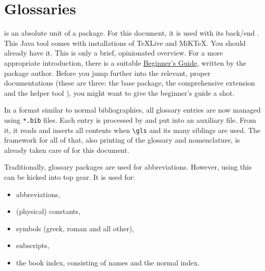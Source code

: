 \section{Glossaries}
\label{ch:glossaries}

 is an absolute unit of a package.
For this document, it is used with its back\-/end .
This Java tool comes with installations of TeXLive and MiKTeX.
You should already have it.
This  is only a brief, opinionated overview.
For a more appropriate introduction, there is a suitable
\href{http://tug.ctan.org/macros/latex/contrib/glossaries/glossariesbegin.pdf}{Beginner's Guide},
written by the package author.
Before you jump further into the relevant, proper documentations (these are three: the
 base package, the comprehensive extension
 and the helper tool ), you might
want to give the beginner's guide a shot.

In a format similar to normal bibliographies, all glossary entries are now managed
using \texttt{*.bib} files.
Each entry is processed by  and put into an auxiliary file.
From it, it reads and inserts all contents when \verb|\gls| and its many siblings
are used.
The framework for all of that, also printing of the glossary and nomenclature,
is already taken care of for this document.

Traditionally, glossary packages are used for abbreviations.
However, using  this can be kicked into top gear.
It is used for:
\begin{itemize}
    \item abbreviations,
    \item (physical) constants,
    \item symbols (greek, roman and all other),
    \item subscripts,
    \item the book index, consisting of names and the normal index.
\end{itemize}

